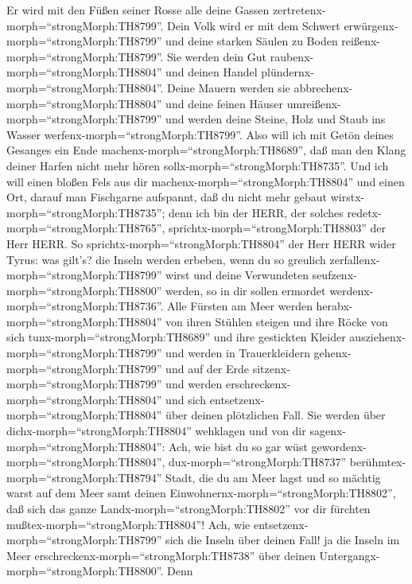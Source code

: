  Er wird mit den Füßen seiner Rosse alle deine Gassen
zertretenx-morph=``strongMorph:TH8799''. Dein Volk wird er mit dem
Schwert erwürgenx-morph=``strongMorph:TH8799'' und deine starken Säulen
zu Boden reißenx-morph=``strongMorph:TH8799''.  Sie werden
dein Gut raubenx-morph=``strongMorph:TH8804'' und deinen Handel
plündernx-morph=``strongMorph:TH8804''. Deine Mauern werden sie
abbrechenx-morph=``strongMorph:TH8804'' und deine feinen Häuser
umreißenx-morph=``strongMorph:TH8799'' und werden deine Steine, Holz und
Staub ins Wasser werfenx-morph=``strongMorph:TH8799''. 
Also will ich mit Getön deines Gesanges ein Ende
machenx-morph=``strongMorph:TH8689'', daß man den Klang deiner Harfen
nicht mehr hören sollx-morph=``strongMorph:TH8735''.  Und
ich will einen bloßen Fels aus dir machenx-morph=``strongMorph:TH8804''
und einen Ort, darauf man Fischgarne aufspannt, daß du nicht mehr gebaut
wirstx-morph=``strongMorph:TH8735''; denn ich bin der HERR, der solches
redetx-morph=``strongMorph:TH8765'',
sprichtx-morph=``strongMorph:TH8803'' der Herr HERR.  So
sprichtx-morph=``strongMorph:TH8804'' der Herr HERR wider Tyrus: was
gilt's? die Inseln werden erbeben, wenn du so greulich
zerfallenx-morph=``strongMorph:TH8799'' wirst und deine Verwundeten
seufzenx-morph=``strongMorph:TH8800'' werden, so in dir sollen ermordet
werdenx-morph=``strongMorph:TH8736''.  Alle Fürsten am Meer
werden herabx-morph=``strongMorph:TH8804'' von ihren Stühlen steigen und
ihre Röcke von sich tunx-morph=``strongMorph:TH8689'' und ihre
gestickten Kleider ausziehenx-morph=``strongMorph:TH8799'' und werden in
Trauerkleidern gehenx-morph=``strongMorph:TH8799'' und auf der Erde
sitzenx-morph=``strongMorph:TH8799'' und werden
erschreckenx-morph=``strongMorph:TH8804'' und sich
entsetzenx-morph=``strongMorph:TH8804'' über deinen plötzlichen Fall.
 Sie werden über dichx-morph=``strongMorph:TH8804''
wehklagen und von dir sagenx-morph=``strongMorph:TH8804'': Ach, wie bist
du so gar wüst gewordenx-morph=``strongMorph:TH8804'',
dux-morph=``strongMorph:TH8737'' berühmtex-morph=``strongMorph:TH8794''
Stadt, die du am Meer lagst und so mächtig warst auf dem Meer samt
deinen Einwohnernx-morph=``strongMorph:TH8802'', daß sich das ganze
Landx-morph=``strongMorph:TH8802'' vor dir fürchten
mußtex-morph=``strongMorph:TH8804''!  Ach, wie
entsetzenx-morph=``strongMorph:TH8799'' sich die Inseln über deinen
Fall! ja die Inseln im Meer erschreckenx-morph=``strongMorph:TH8738''
über deinen Untergangx-morph=``strongMorph:TH8800''.  Denn
